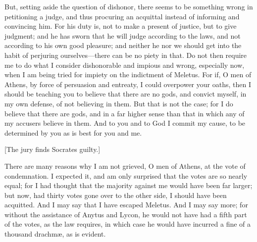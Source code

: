 \documentclass[12pt]{article}
\begin{document}
But, setting aside the question of dishonor, there seems to be something
wrong in petitioning a judge, and thus procuring an acquittal instead
of informing and convincing him. For his duty is, not to make a present
of justice, but to give judgment; and he has sworn that he will judge
according to the laws, and not according to his own good pleasure;
and neither he nor we should get into the habit of perjuring ourselves---there
can be no piety in that. Do not then require me to do what I consider
dishonorable and impious and wrong, especially now, when
I am being tried for impiety on the indictment of Meletus. For if,
O men of Athens, by force of persuasion and entreaty, I could overpower
your oaths, then I should be teaching you to believe that there are
no gods, and convict myself, in my own defense, of not believing in
them. But that is not the case; for I do believe that there are gods,
and in a far higher sense than that in which any of my accusers believe
in them. And to you and to God I commit my cause, to be determined
by you as is best for you and me.

\begin{center}
[The jury finds Socrates guilty.]
\end{center}

\noindent There are many reasons why I am not grieved, O men of Athens, at the
vote of condemnation. I expected it, and am only surprised that the
votes are so nearly equal; for I had thought that the majority against
me would have been far larger; but now, had thirty votes gone over
to the other side, I should have been acquitted. And I may say that
I have escaped Meletus. And I may say more; for without the assistance
of Anytus and Lycon, he would not have had a fifth part of the votes,
as the law requires, in which case he would have incurred a fine of
a thousand drachm{\ae}, as is evident.
\end{document}
